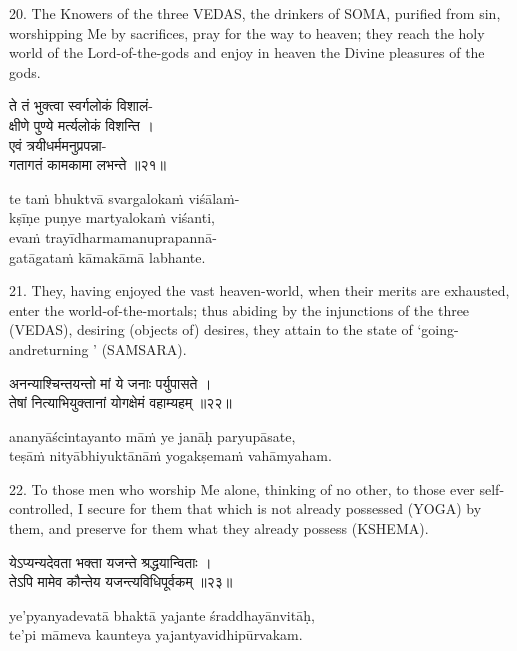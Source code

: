 20. The Knowers of the three VEDAS, the drinkers of SOMA, purified from sin,
worshipping Me by sacrifices, pray for the way to heaven; they reach the holy
world of the Lord-of-the-gods and enjoy in heaven the Divine pleasures of the
gods.

\begin{gitaverse}
ते तं भुक्त्वा स्वर्गलोकं विशालं- \\
\tab क्षीणे पुण्ये मर्त्यलोकं विशन्ति । \\
एवं त्रयीधर्ममनुप्रपन्ना- \\
\tab गतागतं कामकामा लभन्ते ॥२१॥
\end{gitaverse}

\begin{transliteration}
te taṁ bhuktvā svargalokaṁ viśālaṁ- \\
\tab kṣīṇe puṇye martyalokaṁ viśanti, \\
evaṁ trayīdharmamanuprapannā- \\
\tab gatāgataṁ kāmakāmā labhante.
\end{transliteration}

21. They, having enjoyed the vast heaven-world, when their merits are
exhausted, enter the world-of-the-mortals; thus abiding by the injunctions of
the three (VEDAS), desiring (objects of) desires, they attain to the state of
`going-andreturning ' (SAMSARA).

\begin{gitaverse}
अनन्याश्चिन्तयन्तो मां ये जनाः पर्युपासते । \\
तेषां नित्याभियुक्तानां योगक्षेमं वहाम्यहम् ॥२२॥
\end{gitaverse}

\begin{transliteration}
ananyāścintayanto māṁ ye janāḥ paryupāsate, \\
teṣāṁ nityābhiyuktānāṁ yogakṣemaṁ vahāmyaham.
\end{transliteration}

22. To those men who worship Me alone, thinking of no other, to those ever
self-controlled, I secure for them that which is not already possessed (YOGA)
by them, and preserve for them what they already possess (KSHEMA).

\begin{gitaverse}
येऽप्यन्यदेवता भक्ता यजन्ते श्रद्धयान्विताः । \\
तेऽपि मामेव कौन्तेय यजन्त्यविधिपूर्वकम् ॥२३॥
\end{gitaverse}

\begin{transliteration}
ye'pyanyadevatā bhaktā yajante śraddhayānvitāḥ, \\
te'pi māmeva kaunteya yajantyavidhipūrvakam.
\end{transliteration}

